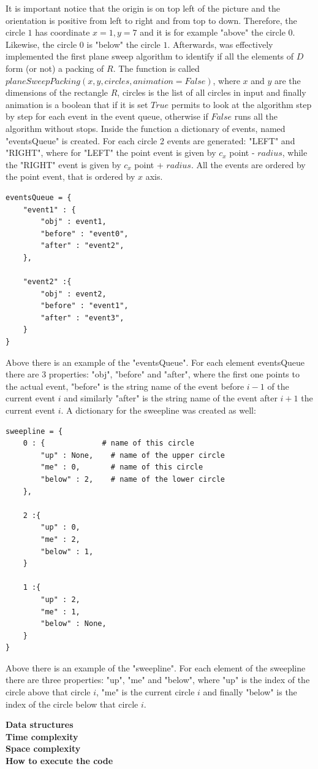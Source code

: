 \documentclass[12pt]{article}
\begin{document}
\noindent It is important notice that the origin is on top left of the picture and the orientation is positive from left to right and from top to down. Therefore, the circle $1$ has coordinate $x=1, y=7$ and it is for example "above" the circle $0$. Likewise, the circle $0$ is "below" the circle $1$. Afterwards, was effectively implemented the first plane sweep algorithm to identify if all the elements of $D$ form (or not) a packing of $R$. The function is called $planeSweepPacking(x, y, circles, animation = False)$, where $x$ and $y$ are the dimensions of the rectangle $R$, circles is the list of all circles in input and finally animation is a boolean that if it is set $True$ permits to look at the algorithm step by step for each event in the event queue, otherwise if $False$ runs all the algorithm without stops. Inside the function a dictionary of events, named "eventsQueue" is created. For each circle 2 events are generated: "LEFT" and "RIGHT", where for "LEFT" the point event is given by $c_x$ point - $radius$, while the "RIGHT" event is given by $c_x$ point + $radius$. All the events are ordered by the point event, that is ordered by $x$ axis.  

\begin{lstlisting}
eventsQueue = {
	"event1" : {
		"obj" : event1,
		"before" : "event0",
		"after" : "event2",
	},
	
	"event2" :{
		"obj" : event2,
		"before" : "event1",
		"after" : "event3",
	}
}
\end{lstlisting}

\noindent Above there is an example of the "eventsQueue". For each element eventsQueue there are 3 properties: "obj", "before" and "after", where the first one points to the actual event, "before" is the string name of the event before $i-1$ of the current event $i$ and similarly "after" is the string name of the event after $i+1$ the current event $i$. A dictionary for the sweepline was created as well:

\begin{lstlisting}
sweepline = {
	0 : {             # name of this circle
		"up" : None,    # name of the upper circle
		"me" : 0,       # name of this circle
		"below" : 2,    # name of the lower circle
	},
	
	2 :{
		"up" : 0,
		"me" : 2,
		"below" : 1,
	}
	
	1 :{
		"up" : 2,
		"me" : 1,
		"below" : None,
	}
}
\end{lstlisting}
Above there is an example of the "sweepline". For each element of the sweepline there are three properties: "up", "me" and "below", where "up" is the index of the circle above that circle $i$, "me" is the current circle $i$ and finally "below" is the index of the circle below that circle $i$.

\noindent \textbf{Data structures}\\

\noindent \textbf{Time complexity}\\

\noindent \textbf{Space complexity}\\

\noindent \textbf{How to execute the code}\\
\end{document}
